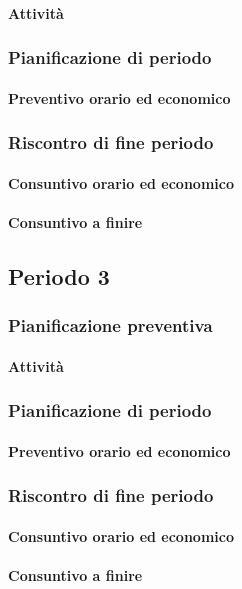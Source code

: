 \paragraph{Attività}


\subsubsection{Pianificazione di periodo}



\paragraph{Preventivo orario ed economico}



\subsubsection{Riscontro di fine periodo}


\paragraph{Consuntivo orario ed economico}


\paragraph{Consuntivo a finire}





\subsection{Periodo 3}

\subsubsection{Pianificazione preventiva}

\paragraph{Attività}


\subsubsection{Pianificazione di periodo}



\paragraph{Preventivo orario ed economico}



\subsubsection{Riscontro di fine periodo}


\paragraph{Consuntivo orario ed economico}


\paragraph{Consuntivo a finire}
